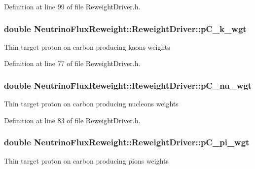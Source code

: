Definition at line 99 of file Reweight\-Driver.\-h.

\hypertarget{class_neutrino_flux_reweight_1_1_reweight_driver_a082aaa736863e7bdfc8a057fcc78164c}{
\subsubsection[{p\-C\-\_\-k\-\_\-wgt}]{\setlength{\rightskip}{0pt plus 5cm}double Neutrino\-Flux\-Reweight\-::\-Reweight\-Driver\-::p\-C\-\_\-k\-\_\-wgt}}\label{class_neutrino_flux_reweight_1_1_reweight_driver_a082aaa736863e7bdfc8a057fcc78164c}
Thin target proton on carbon producing kaons weights 

Definition at line 77 of file Reweight\-Driver.\-h.

\hypertarget{class_neutrino_flux_reweight_1_1_reweight_driver_a96bc68526c4939c0018aa41d94c3a106}{
\subsubsection[{p\-C\-\_\-nu\-\_\-wgt}]{\setlength{\rightskip}{0pt plus 5cm}double Neutrino\-Flux\-Reweight\-::\-Reweight\-Driver\-::p\-C\-\_\-nu\-\_\-wgt}}\label{class_neutrino_flux_reweight_1_1_reweight_driver_a96bc68526c4939c0018aa41d94c3a106}
Thin target proton on carbon producing nucleons weights 

Definition at line 83 of file Reweight\-Driver.\-h.

\hypertarget{class_neutrino_flux_reweight_1_1_reweight_driver_a488fa95dec3079d30e56973fd4de3783}{
\subsubsection[{p\-C\-\_\-pi\-\_\-wgt}]{\setlength{\rightskip}{0pt plus 5cm}double Neutrino\-Flux\-Reweight\-::\-Reweight\-Driver\-::p\-C\-\_\-pi\-\_\-wgt}}\label{class_neutrino_flux_reweight_1_1_reweight_driver_a488fa95dec3079d30e56973fd4de3783}
Thin target proton on carbon producing pions weights 

